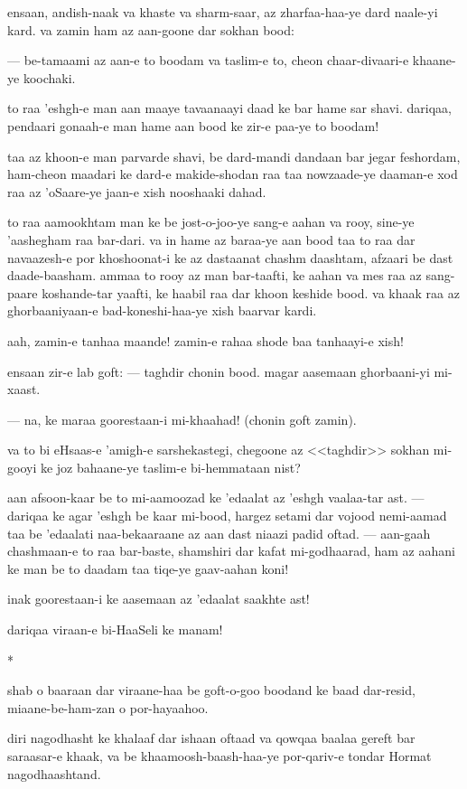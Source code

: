 \documentclass{article}
\renewcommand{\*}{%
	\begin{center}*\end{center}
}
\begin{document}
ensaan, andish-naak va khaste va sharm-saar, az zharfaa-haa-ye dard
naale-yi kard. va zamin ham az aan-goone dar sokhan bood:

--- be-tamaami az aan-e to boodam va taslim-e to, cheon chaar-divaari-e
khaane-ye koochaki.

to raa 'eshgh-e man aan maaye tavaanaayi daad ke bar hame sar shavi.
dariqaa, pendaari gonaah-e man hame aan bood ke zir-e paa-ye to
boodam!

taa az khoon-e man parvarde shavi, be dard-mandi dandaan bar jegar
feshordam, ham-cheon maadari ke dard-e makide-shodan raa taa nowzaade-ye
daaman-e xod raa az 'oSaare-ye jaan-e xish nooshaaki dahad.

to raa aamookhtam man ke be jost-o-joo-ye sang-e aahan va rooy,
sine-ye 'aashegham raa bar-dari. va in hame az baraa-ye aan bood taa to
raa dar navaazesh-e por khoshoonat-i ke az dastaanat chashm daashtam,
afzaari be dast daade-baasham. ammaa to rooy az man bar-taafti, ke
aahan va mes raa az sang-paare koshande-tar yaafti, ke haabil raa dar
khoon keshide bood. va khaak raa az ghorbaaniyaan-e bad-koneshi-haa-ye
xish baarvar kardi.

aah, zamin-e tanhaa maande! zamin-e rahaa shode baa tanhaayi-e xish!

ensaan zir-e lab goft: --- taghdir chonin bood. magar aasemaan
ghorbaani-yi mi-xaast.

--- na, ke maraa goorestaan-i mi-khaahad! (chonin goft zamin).

va to bi eHsaas-e 'amigh-e sarshekastegi, chegoone az <<taghdir>> sokhan
mi-gooyi ke joz bahaane-ye taslim-e bi-hemmataan nist?

aan afsoon-kaar be to mi-aamoozad ke 'edaalat az 'eshgh vaalaa-tar ast.
--- dariqaa ke agar 'eshgh be kaar mi-bood, hargez setami dar vojood
nemi-aamad taa be 'edaalati naa-bekaaraane az aan dast niaazi padid
oftad. --- aan-gaah chashmaan-e to raa bar-baste, shamshiri dar kafat
mi-godhaarad, ham az aahani ke man be to daadam taa tiqe-ye
gaav-aahan koni!

inak goorestaan-i ke aasemaan az 'edaalat saakhte ast!

dariqaa viraan-e bi-HaaSeli ke manam!

\*

shab o baaraan dar viraane-haa be goft-o-goo boodand ke baad
dar-resid, miaane-be-ham-zan o por-hayaahoo.

diri nagodhasht ke khalaaf dar ishaan oftaad va qowqaa baalaa gereft
bar saraasar-e khaak, va be khaamoosh-baash-haa-ye por-qariv-e tondar
Hormat nagodhaashtand.
\end{document}
